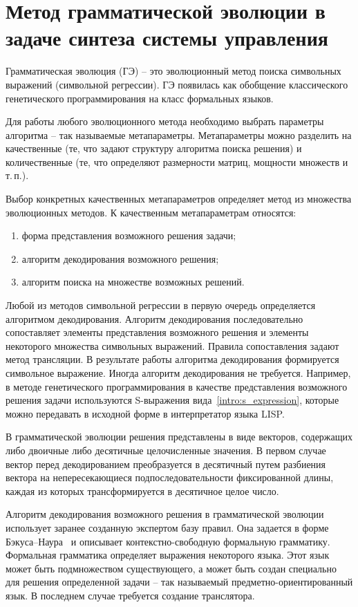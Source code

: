 \chapter{Метод грамматической эволюции в задаче синтеза системы управления} \label{chapter:ge}

Грамматическая эволюция (ГЭ) -- это эволюционный метод поиска символьных выражений (символьной регрессии).
ГЭ появилась как обобщение классического генетического программирования на класс формальных языков.

Для работы любого эволюционного метода необходимо выбрать параметры алгоритма -- так называемые метапараметры.
Метапараметры можно разделить на качественные (те, что задают структуру алгоритма поиска решения) и количественные (те, что определяют размерности матриц, мощности множеств и т.\,п.).

Выбор конкретных качественных метапараметров определяет метод из множества эволюционных методов. 
К качественным метапараметрам относятся:
\begin{enumerate}
    \item форма представления возможного решения задачи;
    \item алгоритм декодирования возможного решения;
    \item алгоритм поиска на множестве возможных решений.
\end{enumerate}

Любой из методов символьной регрессии в первую очередь определяется алгоритмом декодирования.
Алгоритм декодирования последовательно сопоставляет элементы представления возможного решения и элементы некоторого множества символьных выражений.
Правила сопоставления задают метод трансляции.
В результате работы алгоритма декодирования формируется символьное выражение.
Иногда алгоритм декодирования не требуется.
Например, в методе генетического программирования в качестве представления возможного решения задачи используются S-выражения вида~\eqref{intro:s_expression}, которые можно передавать в исходной форме в интерпретатор языка LISP.

В грамматической эволюции решения представлены в виде векторов, содержащих либо двоичные либо десятичные целочисленные значения.
В первом случае вектор перед декодированием преобразуется в десятичный путем разбиения вектора на непересекающиеся подпоследовательности фиксированной длины, каждая из которых трансформируется в десятичное целое число.

Алгоритм декодирования возможного решения в грамматической эволюции использует заранее созданную экспертом базу правил.
Она задается в форме Бэкуса--Наура~\cite{Backus1959} и описывает контекстно-свободную формальную грамматику.
Формальная грамматика определяет выражения некоторого языка.
Этот язык может быть подмножеством существующего, а может быть создан специально для решения определенной задачи -- так называемый предметно-ориентированный язык.
В последнем случае требуется создание транслятора.

